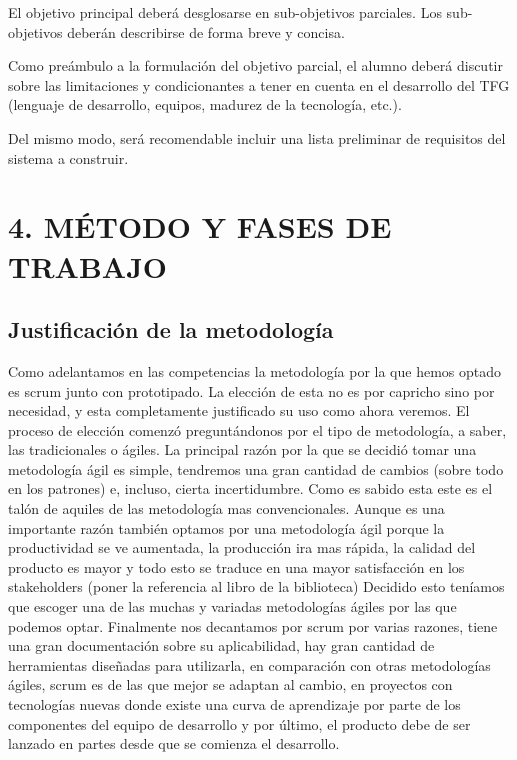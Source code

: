 \documentclass[a4paper]{article}
\begin{document}
El objetivo principal deber\'a desglosarse en sub-objetivos parciales. Los sub-objetivos deberán describirse de forma breve y concisa.

Como pre\'ambulo a la formulaci\'on del objetivo parcial, el alumno deber\'a discutir sobre las limitaciones y
condicionantes a tener en cuenta en el desarrollo del TFG (lenguaje de desarrollo, equipos, madurez de la tecnolog\'ia,
etc.).

Del mismo modo, ser\'a recomendable incluir una lista preliminar de requisitos del sistema a construir.

\section[4. M\'ETODO Y FASES DE TRABAJO]{4. M\'ETODO Y FASES DE TRABAJO}

\bigskip

\subsection{Justificación de la metodología}
Como adelantamos en las competencias la metodología por la que hemos optado es scrum junto con prototipado. La elección de esta no es por capricho sino por necesidad, y esta completamente justificado su uso como ahora veremos. El proceso de elección comenzó preguntándonos por el tipo de metodología, a saber, las tradicionales o ágiles. La principal razón por la que se decidió tomar una metodología ágil es simple, tendremos una gran cantidad de cambios (sobre todo en los patrones) e, incluso, cierta incertidumbre. Como es sabido esta este es el talón de aquiles de las metodología mas convencionales. Aunque es una importante razón también optamos por una metodología ágil porque la productividad se ve aumentada, la producción ira mas rápida, la calidad del producto es mayor y todo esto se traduce en una mayor satisfacción en los stakeholders (poner la referencia al libro de la biblioteca) Decidido esto teníamos que escoger una de las muchas y variadas metodologías ágiles por las que podemos optar. Finalmente nos decantamos por scrum por varias razones, tiene una gran documentación sobre su aplicabilidad, hay gran cantidad de herramientas diseñadas para utilizarla, en comparación con otras metodologías ágiles, scrum es de las que mejor se adaptan al cambio, en proyectos con tecnologías nuevas donde existe una curva de aprendizaje por parte de los componentes del equipo de desarrollo y por último, el producto debe de ser lanzado en partes desde que se comienza el desarrollo.
\end{document}
